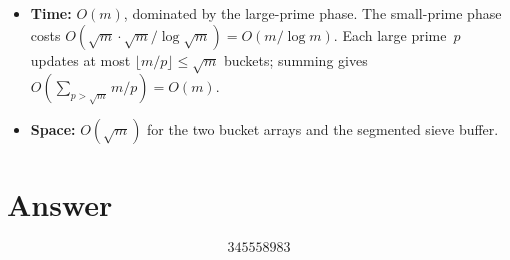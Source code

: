 \documentclass[12pt,a4paper]{article}
\begin{document}
\begin{itemize}
    \item \textbf{Time:} $O(m)$, dominated by the large-prime phase. The small-prime phase costs $O(\sqrt{m} \cdot \sqrt{m} / \log \sqrt{m}) = O(m / \log m)$. Each large prime~$p$ updates at most $\lfloor m/p \rfloor \le \sqrt{m}$ buckets; summing gives $O(\sum_{p > \sqrt{m}} m/p) = O(m)$.
    \item \textbf{Space:} $O(\sqrt{m})$ for the two bucket arrays and the segmented sieve buffer.
\end{itemize}

\section{Answer}

\[
\boxed{345558983}
\]
\end{document}
